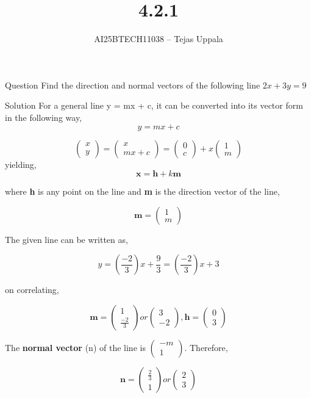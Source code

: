 \documentclass{beamer}
\title{4.2.1}
\author{AI25BTECH11038 -- Tejas Uppala}
\providecommand{\brak}[1]{\ensuremath{\left(#1\right)}}
\theoremstyle{remark}
\newcommand{\myvec}[1]{\ensuremath{\begin{pmatrix}#1\end{pmatrix}}}
\numberwithin{equation}{section}
\begin{document}
\maketitle
\begin{frame}{Question}
  Find the direction and normal vectors of the following line $2x + 3y = 9$  
\end{frame}

\begin{frame}{Solution}
  For a general line y = mx + c, it can be converted into its vector form in the following way,  
  \begin{equation}
    y = mx + c
\end{equation}

\begin{equation}
    \myvec{x\\y} = \myvec{x\\mx+c} = \myvec{0\\c} + x\myvec{1\\m}    
\end{equation}
yielding, 
\begin{equation}
    \textbf{x} = \textbf{h} + k\textbf{m}
\end{equation}
\end{frame}

\begin{frame}
    where \textbf{h} is any point on the line and \textbf{m} is the direction vector of the line,

\begin{equation}
    \textbf{m} = \myvec{1\\m}
\end{equation}

The given line can be written as, 

\begin{equation}
    y = \brak{\frac{-2}{3}}x + \frac{9}{3} = \brak{\frac{-2}{3}}x + 3
\end{equation}

on correlating,

\begin{equation}
    \textbf{m} = \myvec{1 \\ \frac{-2}{3}} or \myvec{3\\-2}, \textbf{h} = \myvec{0\\3}
\end{equation}

The \textbf{normal vector} (n) of the line is \myvec{-m\\1}. Therefore, 

\begin{equation}
    \textbf{n} = \myvec{\frac{2}{3}\\1} or \myvec{2\\3}
\end{equation}
\end{frame}
\end{document}

